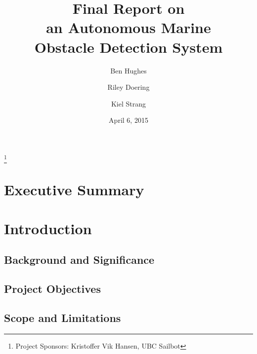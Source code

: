 \documentclass[amsmath, amssymb, aps, pra, 12pt]{revtex4-1}
\begin{document}
\title{Final Report on\\an Autonomous Marine\\Obstacle Detection System}
\author{Ben Hughes}
\thanks{Project Sponsors: Kristoffer Vik Hansen, UBC Sailbot}
\author{Riley Doering}
\author{Kiel Strang}
\date{April 6, 2015}
\maketitle


\section*{Executive Summary}


\newpage
\tableofcontents

\makeatletter
\let\toc@pre\relax
\let\toc@post\relax
\makeatother 

\newpage
\listoffigures
\listoftables

\clearpage
\newpage
{}


\section{\label{sec:introduction}Introduction}


\subsection{\label{sec:introduction:backgroundandsignificance}Background and Significance}


\subsection{\label{sec:introduction:projectobjectives}Project Objectives}


\subsection{\label{sec:introduction:scopeandlimitations}Scope and Limitations}

\end{document}
